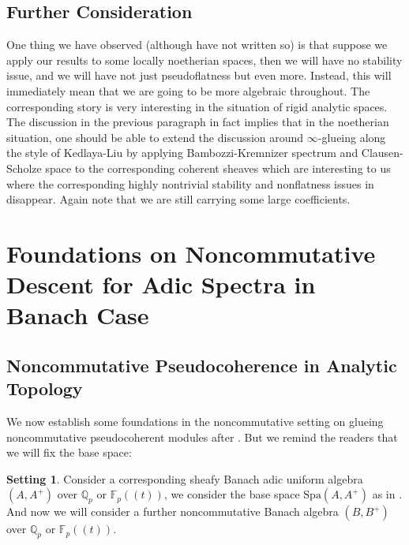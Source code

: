 \documentclass[12pt]{amsart}
\theoremstyle{definition}
\numberwithin{equation}{section}
\newtheorem{setting}[theorem]{Setting}
\begin{document}
\subsection{Further Consideration}

\indent One thing we have observed (although have not written so) is that suppose we apply our results to some locally noetherian spaces, then we will have no stability issue, and we will have not just pseudoflatness but even more. Instead, this will immediately mean that we are going to be more algebraic throughout. The corresponding story is very interesting in the situation of rigid analytic spaces.\\ 

\indent The discussion in the previous paragraph in fact implies that in the noetherian situation, one should be able to extend the discussion around $\infty$-glueing along the style of Kedlaya-Liu by applying Bambozzi-Kremnizer spectrum \cite{BK1} and Clausen-Scholze space \cite{CS} to the corresponding coherent sheaves which are interesting to us where the corresponding highly nontrivial stability and nonflatness issues in \cite{KL2} disappear. Again note that we are still carrying some large coefficients.\\








\newpage 


\section{Foundations on Noncommutative Descent for Adic Spectra in Banach Case}

\subsection{Noncommutative Pseudocoherence in Analytic Topology}


\indent We now establish some foundations in the noncommutative setting on glueing noncommutative pseudocoherent modules after \cite[Chapter 2]{KL2}. But we remind the readers that we will fix the base space:

\begin{setting} \label{setting2.1}
Consider a corresponding sheafy Banach adic uniform algebra $(A,A^+)$ over $\mathbb{Q}_p$ or $\mathbb{F}_p((t))$, we consider the base space $\mathrm{Spa}(A,A^+)$ as in \cite[Chapter 2]{KL2}. And now we will consider a further noncommutative Banach algebra $(B,B^+)$ over $\mathbb{Q}_p$ or $\mathbb{F}_p((t))$. 	
\end{setting}
\end{document}

